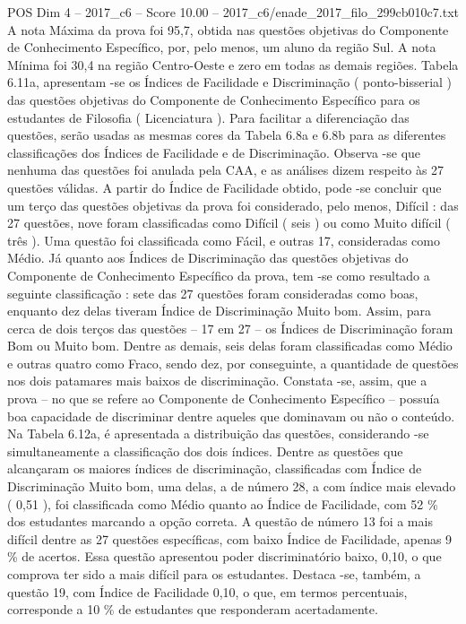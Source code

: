 \begin{textsample}{POS Dim 4 – 2017\_c6 – Score 10.00 – 2017\_c6/enade\_2017\_filo\_299cb010c7.txt}
A nota Máxima da prova foi 95,7, obtida nas questões objetivas do Componente de Conhecimento Específico, por, pelo menos, um aluno da região Sul.
A nota Mínima foi 30,4 na região Centro-Oeste e zero em todas as demais regiões.
Tabela 6.11a, apresentam -se os Índices de Facilidade e Discriminação ( ponto-bisserial ) das questões objetivas do Componente de Conhecimento Específico para os estudantes de Filosofia ( Licenciatura ).
Para facilitar a diferenciação das questões, serão usadas as mesmas cores da Tabela 6.8a e 6.8b para as diferentes classificações dos Índices de Facilidade e de Discriminação.
Observa -se que nenhuma das questões foi anulada pela CAA, e as análises dizem respeito às 27 questões válidas.
A partir do Índice de Facilidade obtido, pode -se concluir que um terço das questões objetivas da prova foi considerado, pelo menos, Difícil : das 27 questões, nove foram classificadas como Difícil ( seis ) ou como Muito difícil ( três ).
Uma questão foi classificada como Fácil, e outras 17, consideradas como Médio.
Já quanto aos Índices de Discriminação das questões objetivas do Componente de Conhecimento Específico da prova, tem -se como resultado a seguinte classificação : sete das 27 questões foram consideradas como boas, enquanto dez delas tiveram Índice de Discriminação Muito bom.
Assim, para cerca de dois terços das questões – 17 em 27 – os Índices de Discriminação foram Bom ou Muito bom.
Dentre as demais, seis delas foram classificadas como Médio e outras quatro como Fraco, sendo dez, por conseguinte, a quantidade de questões nos dois patamares mais baixos de discriminação.
Constata -se, assim, que a prova – no que se refere ao Componente de Conhecimento Específico – possuía boa capacidade de discriminar dentre aqueles que dominavam ou não o conteúdo.
Na Tabela 6.12a, é apresentada a distribuição das questões, considerando -se simultaneamente a classificação dos dois índices.
Dentre as questões que alcançaram os maiores índices de discriminação, classificadas com Índice de Discriminação Muito bom, uma delas, a de número 28, a com índice mais elevado ( 0,51 ), foi classificada como Médio quanto ao Índice de Facilidade, com 52 \% dos estudantes marcando a opção correta.
A questão de número 13 foi a mais difícil dentre as 27 questões específicas, com baixo Índice de Facilidade, apenas 9 \% de acertos.
Essa questão apresentou poder discriminatório baixo, 0,10, o que comprova ter sido a mais difícil para os estudantes.
Destaca -se, também, a questão 19, com Índice de Facilidade 0,10, o que, em termos percentuais, corresponde a 10 \% de estudantes que responderam acertadamente.

\end{textsample}

